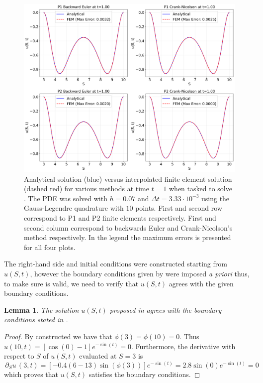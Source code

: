 \documentclass{article}
\newtheorem{lemma}[thm]{Lemma}
\newcommand{\darg}[2]{\ensuremath{\, \partial_{#2}#1} \, }
\newcommand{\dS}[1]{\ensuremath{\darg{#1}{S}}}
\newcommand{\dSu}{\dS{u}}
\begin{document}
\begin{figure}[!ht]
    \centering
    \includegraphics[width=0.92\linewidth]{code/images/fem_vs_analytical_BlackScholesConstructedCos.png}
    \caption{Analytical solution (blue) versus interpolated finite element solution (dashed red) for various methods at time $t=1$ when tasked to solve . The PDE was solved with $h =0.07$ and $\Delta t = 3.33 \cdot 10^{-3} $ using the Gauss-Legendre quadrature with $10$ points. First and second row correspond to P1 and P2 finite elements respectively. First and second column correspond to backwards Euler and Crank-Nicolson's method respectively. In the legend the maximum errors is presented for all four plots.}
    \label{fig:fem_vs_true_cos}
\end{figure}

The right-hand side and initial conditions were constructed starting from $u(S,t)$, however the boundary conditions given by  were imposed \textit{a priori} thus, to make sure  is valid, we need to verify that $u(S,t)$ agrees with the given boundary conditions.
\begin{lemma}
    The solution $u(S,t)$ proposed in  agrees with the boundary conditions stated in .
\end{lemma}
\begin{proof}
    By constructed we have that $\phi(3)=\phi(10)=0$. Thus $u(10,t)=\left[\cos\left(0\right)-1\right]e^{-\sin(t)} = 0$. Furthermore, the derivative with respect to $S$ of $u(S,t)$ evaluated at $S = 3$ is
    \begin{equation*}
        \dSu(3, t) = \left[-0.4 (6 - 13) \sin(\phi(3))\right]e^{-\sin (t)} = 2.8 \sin(0)e^{-\sin (t)} = 0
    \end{equation*}
    which proves that $u(S,t)$ satisfies the boundary conditions.
\end{proof}
\end{document}
